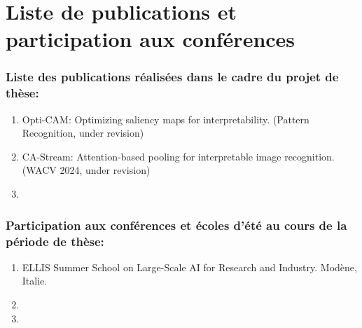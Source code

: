 \newpage
\chapter*{Liste de publications et participation aux conférences}
\subsection*{Liste des publications réalisées dans le cadre du projet de thèse:}
\begin{enumerate}
    \item Opti-CAM: Optimizing saliency maps for interpretability. (Pattern Recognition, under revision)
    \item CA-Stream: Attention-based pooling for interpretable image recognition. (WACV 2024, under revision)
    \item 
\end{enumerate}


\subsection*{Participation aux conférences et écoles d’été au cours de la période de thèse:}
\begin{enumerate}
\item ELLIS Summer School on Large-Scale AI for Research and Industry. Modène, Italie.
\item 
\item 
\end{enumerate}
